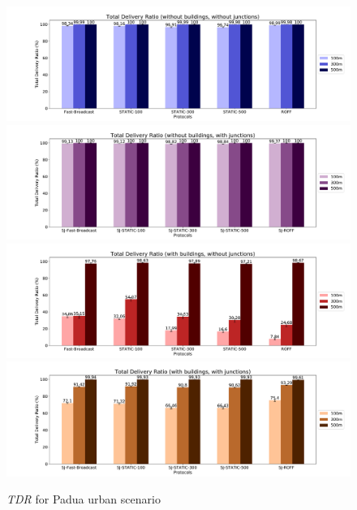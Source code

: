 		\begin{figure}[H]
			\centering
			\includegraphics[width=1.0\textwidth]{immagini/padua-25/b0/j0/tdr}
			\includegraphics[width=1.0\textwidth]{immagini/padua-25/b0/j1/tdr}
			\includegraphics[width=1.0\textwidth]{immagini/padua-25/b1/j0/tdr} %
			\includegraphics[width=1.0\textwidth]{immagini/padua-25/b1/j1/tdr}
			\caption{\textit{TDR} for Padua urban scenario}
			\label{fig:padua-25-tdr}
		\end{figure}
		
